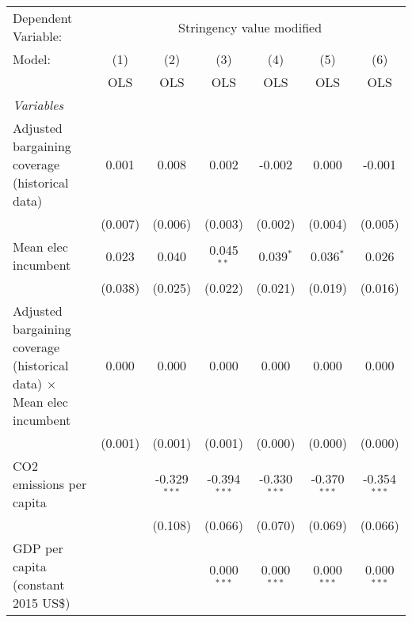 
\begingroup
\centering
\begin{tabular}{lcccccc}
   \toprule
   Dependent Variable: & \multicolumn{6}{c}{Stringency value modified}\\
   Model:                                                                       & (1)     & (2)            & (3)            & (4)            & (5)            & (6)\\  
                                                                                &  OLS    & OLS            & OLS            & OLS            & OLS            & OLS\\  
   \midrule
   \emph{Variables}\\
   Adjusted bargaining coverage (historical data)                               & 0.001   & 0.008          & 0.002          & -0.002         & 0.000          & -0.001\\   
                                                                                & (0.007) & (0.006)        & (0.003)        & (0.002)        & (0.004)        & (0.005)\\   
   Mean elec incumbent                                                          & 0.023   & 0.040          & 0.045$^{**}$   & 0.039$^{*}$    & 0.036$^{*}$    & 0.026\\   
                                                                                & (0.038) & (0.025)        & (0.022)        & (0.021)        & (0.019)        & (0.016)\\   
   Adjusted bargaining coverage (historical data) $\times$ Mean elec incumbent  & 0.000   & 0.000          & 0.000          & 0.000          & 0.000          & 0.000\\   
                                                                                & (0.001) & (0.001)        & (0.001)        & (0.000)        & (0.000)        & (0.000)\\   
   CO2 emissions per capita                                                     &         & -0.329$^{***}$ & -0.394$^{***}$ & -0.330$^{***}$ & -0.370$^{***}$ & -0.354$^{***}$\\   
                                                                                &         & (0.108)        & (0.066)        & (0.070)        & (0.069)        & (0.066)\\   
   GDP per capita (constant 2015 US\$)                                          &         &                & 0.000$^{***}$  & 0.000$^{***}$  & 0.000$^{***}$  & 0.000$^{***}$\\   

\end{tabular}
